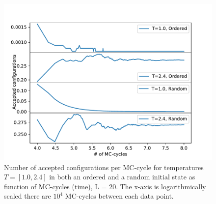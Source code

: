 \documentclass[12pt,english,a4paper]{article}
\begin{document}
\begin{figure}[H]
    \centering
    \includegraphics[scale=0.7]{Figures/Number_of_Accepted_Configs_L_20.pdf}
    \caption{Number of accepted configurations per MC-cycle for temperatures $T=[1.0,2.4]$ in both an ordered and a random initial state as function of MC-cycles (time), L = 20. The x-axis is logarithmically scaled there are $10^4$ MC-cycles between each data point.}
    \label{fig:acc_conf}
\end{figure}
\end{document}

